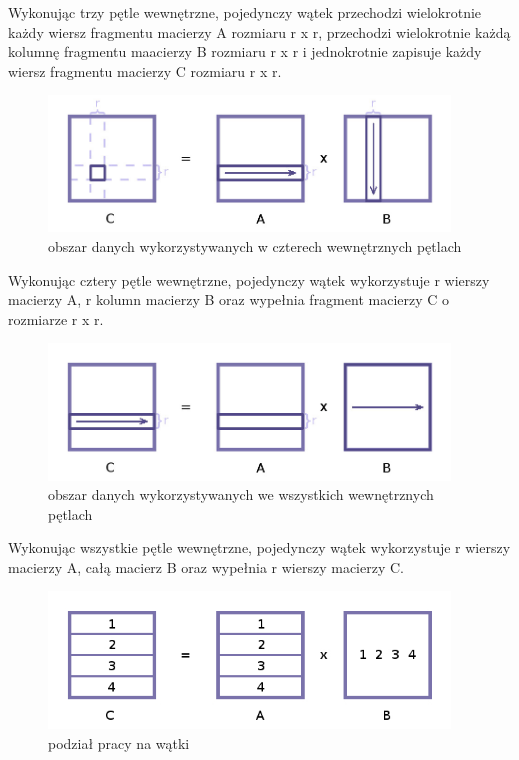 \documentclass[12pt,a4paper]{article}
\begin{document}
Wykonując trzy pętle wewnętrzne, pojedynczy wątek przechodzi wielokrotnie każdy wiersz fragmentu macierzy A rozmiaru r x r, przechodzi wielokrotnie każdą kolumnę fragmentu maacierzy B rozmiaru r x r i jednokrotnie zapisuje każdy wiersz fragmentu macierzy C rozmiaru r x r.

\begin{figure}[H]
  \centering
    \includegraphics[width=0.95\textwidth]{IJKIJK_KKJJIIK.jpg}
    \caption{obszar danych wykorzystywanych w czterech wewnętrznych pętlach}
\end{figure}

Wykonując cztery pętle wewnętrzne, pojedynczy wątek wykorzystuje r wierszy macierzy A, r kolumn macierzy B oraz wypełnia fragment macierzy C o rozmiarze r x r.

\begin{figure}[H]
  \centering
    \includegraphics[width=0.95\textwidth]{IJKIJK_KKJJIIKJ.jpg}
    \caption{obszar danych wykorzystywanych we wszystkich wewnętrznych pętlach}
\end{figure}

Wykonując wszystkie pętle wewnętrzne, pojedynczy wątek wykorzystuje r wierszy macierzy A, całą macierz B oraz wypełnia r wierszy macierzy C.

\begin{figure}[H]
  \centering
    \includegraphics[width=0.95\textwidth]{IJK_KJI.jpg}
    \caption{podział pracy na wątki}
\end{figure}
\end{document}
